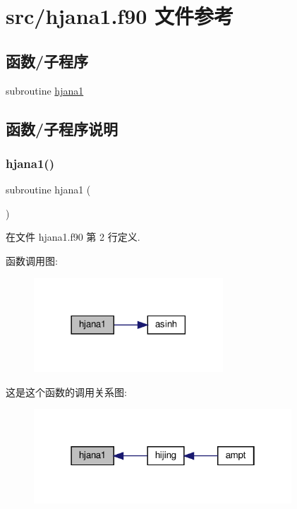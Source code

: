 \hypertarget{hjana1_8f90}{}\section{src/hjana1.f90 文件参考}
\label{hjana1_8f90}
\subsection*{函数/子程序}
\begin{DoxyCompactItemize}
\item 
subroutine \mbox{\hyperlink{hjana1_8f90_abf4b998ca50d965e5133533f88a98364}{hjana1}}
\end{DoxyCompactItemize}


\subsection{函数/子程序说明}
\mbox{\label{hjana1_8f90_abf4b998ca50d965e5133533f88a98364}} 
\subsubsection{\texorpdfstring{hjana1()}{hjana1()}}
{\footnotesize\ttfamily subroutine hjana1 (\begin{DoxyParamCaption}{ }\end{DoxyParamCaption})}



在文件 hjana1.\+f90 第 2 行定义.

函数调用图\+:
\nopagebreak
\begin{figure}[H]
\begin{center}
\leavevmode
\includegraphics[width=201pt]{hjana1_8f90_abf4b998ca50d965e5133533f88a98364_cgraph}
\end{center}
\end{figure}
这是这个函数的调用关系图\+:
\nopagebreak
\begin{figure}[H]
\begin{center}
\leavevmode
\includegraphics[width=274pt]{hjana1_8f90_abf4b998ca50d965e5133533f88a98364_icgraph}
\end{center}
\end{figure}
